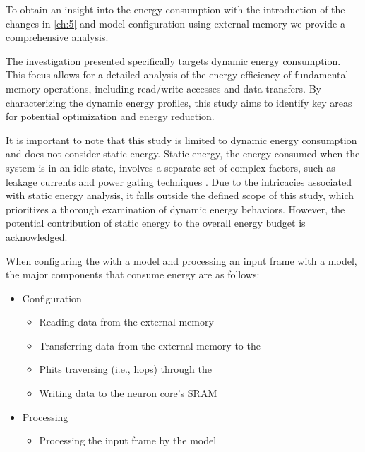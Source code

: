 To obtain an insight into the energy consumption with the introduction of the \confignoc{} changes in \cref{ch:5} and model configuration using external memory we provide a comprehensive analysis.

The investigation presented specifically targets dynamic energy consumption.
This focus allows for a detailed analysis of the energy efficiency of fundamental memory operations, including read/write accesses and data transfers.
By characterizing the dynamic energy profiles, this study aims to identify key areas for potential optimization and energy reduction.

It is important to note that this study is limited to dynamic energy consumption and does not consider static energy.
Static energy, the energy consumed when the system is in an idle state, involves a separate set of complex factors, such as leakage currents and power gating techniques \cite{haj-yahyaStaticPowerModeling2018}.
Due to the intricacies associated with static energy analysis, it falls outside the defined scope of this study, which prioritizes a thorough examination of dynamic energy behaviors.
However, the potential contribution of static energy to the overall energy budget is acknowledged.

When configuring the \graicore{} with a model and processing an input frame with a model, the major components that consume energy are as follows:
\begin{itemize}
    \item Configuration
    \begin{itemize}
        \item Reading data from the external memory
        \item Transferring data from the external memory to the \confignoc{}
        \item Phits traversing (i.e., hops) through the \confignoc{}
        \item Writing data to the neuron core's SRAM
    \end{itemize}
    \item Processing
    \begin{itemize}
        \item Processing the input frame by the model
    \end{itemize}
\end{itemize}

